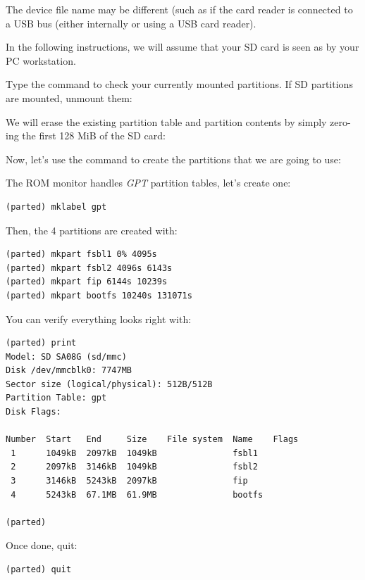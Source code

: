 The device file name may be different (such as 
if the card reader is connected to a USB bus (either internally
or using a USB card reader).

In the following instructions, we will assume that your SD card is
seen as  by your PC workstation.

Type the  command to check your currently mounted
partitions. If SD partitions are mounted, unmount them:


We will erase the existing partition table and partition contents
by simply zero-ing the first 128 MiB of the SD card:


Now, let's use the  command to create the partitions that
we are going to use:


The ROM monitor handles {\em GPT} partition tables, let's create one:

\begin{verbatim}
(parted) mklabel gpt
\end{verbatim}

Then, the 4 partitions are created with:
\begin{verbatim}
(parted) mkpart fsbl1 0% 4095s
(parted) mkpart fsbl2 4096s 6143s
(parted) mkpart fip 6144s 10239s
(parted) mkpart bootfs 10240s 131071s
\end{verbatim}

You can verify everything looks right with:

\begin{verbatim}
(parted) print
Model: SD SA08G (sd/mmc)
Disk /dev/mmcblk0: 7747MB
Sector size (logical/physical): 512B/512B
Partition Table: gpt
Disk Flags:

Number  Start   End     Size    File system  Name    Flags
 1      1049kB  2097kB  1049kB               fsbl1
 2      2097kB  3146kB  1049kB               fsbl2
 3      3146kB  5243kB  2097kB               fip
 4      5243kB  67.1MB  61.9MB               bootfs

(parted)
\end{verbatim}

Once done, quit:
\begin{verbatim}
(parted) quit
\end{verbatim}

